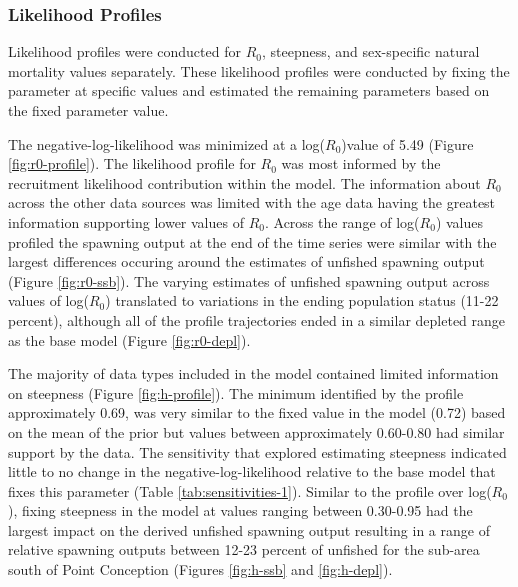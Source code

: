 \documentclass[11pt,
  english,
  letterpaper,
]{article}
\begin{document}
\hypertarget{likelihood-profiles}{%
\subsubsection{Likelihood Profiles}\label{likelihood-profiles}}

Likelihood profiles were conducted for \(R_0\), steepness, and sex-specific natural mortality values separately. These likelihood profiles were conducted by fixing the parameter at specific values and estimated the remaining parameters based on the fixed parameter value.

The negative-log-likelihood was minimized at a log(\(R_0\))value of 5.49 (Figure \ref{fig:r0-profile}). The likelihood profile for \(R_0\) was most informed by the recruitment likelihood contribution within the model. The information about \(R_0\) across the other data sources was limited with the age data having the greatest information supporting lower values of \(R_0\). Across the range of log(\(R_0\)) values profiled the spawning output at the end of the time series were similar with the largest differences occuring around the estimates of unfished spawning output (Figure \ref{fig:r0-ssb}). The varying estimates of unfished spawning output across values of log(\(R_0\)) translated to variations in the ending population status (11-22 percent), although all of the profile trajectories ended in a similar depleted range as the base model (Figure \ref{fig:r0-depl}).

The majority of data types included in the model contained limited information on steepness (Figure \ref{fig:h-profile}). The minimum identified by the profile approximately 0.69, was very similar to the fixed value in the model (0.72) based on the mean of the prior but values between approximately 0.60-0.80 had similar support by the data. The sensitivity that explored estimating steepness indicated little to no change in the negative-log-likelihood relative to the base model that fixes this parameter (Table \ref{tab:sensitivities-1}). Similar to the profile over log(\(R_0\)), fixing steepness in the model at values ranging between 0.30-0.95 had the largest impact on the derived unfished spawning output resulting in a range of relative spawning outputs between 12-23 percent of unfished for the sub-area south of Point Conception (Figures \ref{fig:h-ssb} and \ref{fig:h-depl}).
\end{document}
